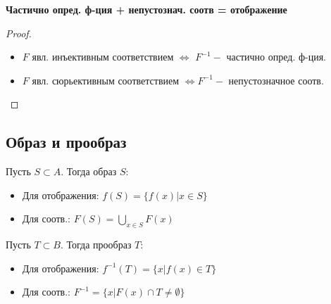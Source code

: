 \begin{note}
        \textbf{Частично опред. ф-ция + непустознач. соотв = отображение}
\end{note}
\begin{proof}
    ~\newline
        \begin{itemize}
            \item $F$ явл. инъективным соответствием $\iff$ $F^{-1} - $ частично опред. ф-ция.
            \item $F$ явл. сюрьективным соответствием $\iff F^{-1} - $ непустозначное соотв.
        \end{itemize}
\end{proof}

\subsection{Образ и прообраз}
\begin{definition}
Пусть $S \subset A$. Тогда образ $S$: 
\begin{itemize}
    \item Для отображения: $f(S) = \{f(x) | x \in S\}$ 
    \item Для соотв.: $F(S) = \bigcup_{x \in S}^{} F(x)$
\end{itemize}
\end{definition}

\begin{definition}
Пусть $T \subset B$. Тогда прообраз $T$:
\begin{itemize}
    \item Для отображения: $f^{-1}(T) = \{x | f(x) \in T\}$
    \item Для соотв.: $F^{-1} = \{x | F(x) \cap T \neq \emptyset\}$
\end{itemize}
\end{definition}

